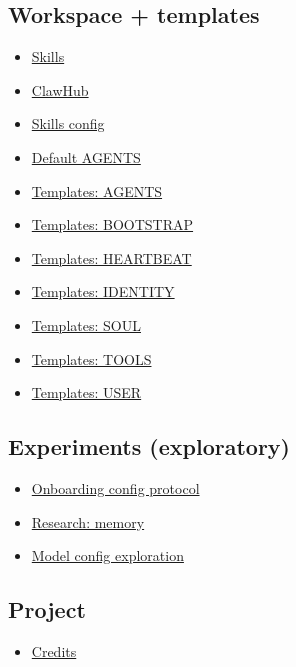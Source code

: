 \subsection{Workspace + templates}


\begin{itemize}
  \item \href{/tools/skills}{Skills}
  \item \href{/tools/clawhub}{ClawHub}
  \item \href{/tools/skills-config}{Skills config}
  \item \href{/reference/AGENTS.default}{Default AGENTS}
  \item \href{/reference/templates/AGENTS}{Templates: AGENTS}
  \item \href{/reference/templates/BOOTSTRAP}{Templates: BOOTSTRAP}
  \item \href{/reference/templates/HEARTBEAT}{Templates: HEARTBEAT}
  \item \href{/reference/templates/IDENTITY}{Templates: IDENTITY}
  \item \href{/reference/templates/SOUL}{Templates: SOUL}
  \item \href{/reference/templates/TOOLS}{Templates: TOOLS}
  \item \href{/reference/templates/USER}{Templates: USER}
\end{itemize}


\subsection{Experiments (exploratory)}


\begin{itemize}
  \item \href{/experiments/onboarding-config-protocol}{Onboarding config protocol}
  \item \href{/experiments/research/memory}{Research: memory}
  \item \href{/experiments/proposals/model-config}{Model config exploration}
\end{itemize}


\subsection{Project}


\begin{itemize}
  \item \href{/reference/credits}{Credits}
\end{itemize}


